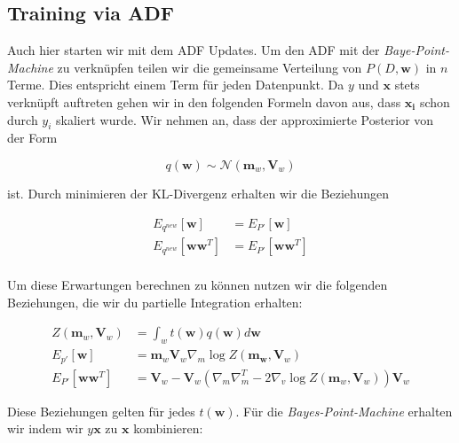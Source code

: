 \documentclass[12pt,a4paper]{scrartcl}
\numberwithin{equation}{section}
\begin{document}
{ \subsection{Training via ADF}
 
 Auch hier starten wir mit dem ADF Updates. Um den ADF mit der \textit{Baye-Point-Machine} zu verknüpfen
 teilen wir die gemeinsame Verteilung von $P(D,\mathbf{w})$ in $n$ Terme. Dies entspricht einem Term für jeden
 Datenpunkt. Da $y$ und $\mathbf{x}$ stets verknüpft auftreten gehen wir in den folgenden Formeln davon aus, dass 
 $\mathbf{x_i}$ schon durch $y_i$ skaliert wurde. Wir nehmen an, dass der approximierte Posterior von der Form
 
 \begin{equation}
  q(\mathbf{w}) \sim \mathcal{N}(\mathbf{m}_w, \mathbf{V}_w)
 \end{equation}

 ist. Durch minimieren der KL-Divergenz erhalten wir die Beziehungen 
 
 \begin{equation}
 \begin{split}
  E_{q^{new}}[\mathbf{w}] &= E_{P'}[\mathbf{w}] \\
  E_{q^{new}}[\mathbf{w} \mathbf{w}^T] &= E_{P'}[\mathbf{w} \mathbf{w}^T] \\
 \end{split}
 \end{equation}

 Um diese Erwartungen berechnen zu können nutzen wir die folgenden Beziehungen, die wir du partielle Integration
 erhalten: 
 
 \begin{equation}
  \begin{split}
  Z(\mathbf{m}_w, \mathbf{V}_w) &= \int_w t(\mathbf{w}) q(\mathbf{w}) d \mathbf{w} \\
  E_{p'}[\mathbf{w}] &= \mathbf{m}_w \mathbf{V}_w \nabla_m \log Z(\mathbf{m_w}, \mathbf{V}_w) \\
  E_{P'}[\mathbf{w} \mathbf{w}^T] &= \mathbf{V}_w - \mathbf{V}_w (\nabla_m \nabla_m^T - 2 \nabla_v \log Z(\mathbf{m}_w, \mathbf{V}_w)) \mathbf{V}_w
  \end{split}
 \end{equation}

 Diese Beziehungen gelten für jedes $t(\mathbf{w})$. Für die \textit{Bayes-Point-Machine} erhalten wir indem wir 
 $y \mathbf{x}$ zu $\mathbf{x}$ kombinieren:
 
}
\end{document}
